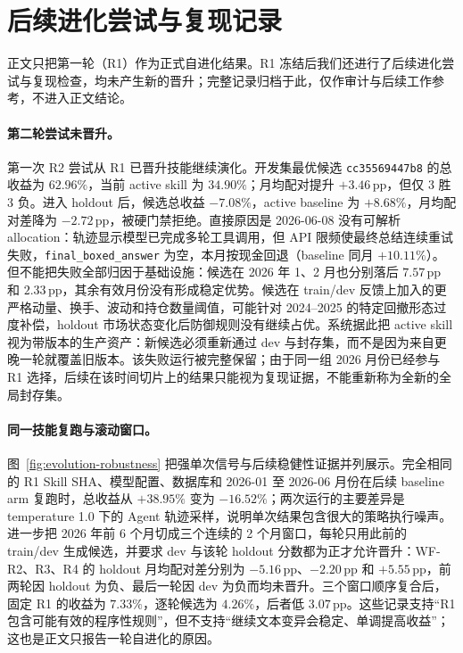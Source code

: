 \documentclass[11pt]{article}
\newcommand{\pp}{\,\mathrm{pp}}
\begin{document}
\section{后续进化尝试与复现记录}
\label{sec:appendix-robustness}

正文只把第一轮（R1）作为正式自进化结果。R1 冻结后我们还进行了后续进化尝试与复现检查，均未产生新的晋升；完整记录归档于此，仅作审计与后续工作参考，不进入正文结论。

\paragraph{第二轮尝试未晋升。}
第一次 R2 尝试从 R1 已晋升技能继续演化。开发集最优候选 \texttt{cc35569447b8} 的总收益为 $62.96\%$，当前 active skill 为 $34.90\%$；月均配对提升 $+3.46\pp$，但仅 3 胜 3 负。进入 holdout 后，候选总收益 $-7.08\%$，active baseline 为 $+8.68\%$，月均配对差降为 $-2.72\pp$，被硬门禁拒绝。直接原因是 2026-06-08 没有可解析 allocation：轨迹显示模型已完成多轮工具调用，但 API 限频使最终总结连续重试失败，\texttt{final\_boxed\_answer} 为空，本月按现金回退（baseline 同月 $+10.11\%$）。但不能把失败全部归因于基础设施：候选在 2026 年 1、2 月也分别落后 $7.57\pp$ 和 $2.33\pp$，其余有效月份没有形成稳定优势。候选在 train/dev 反馈上加入的更严格动量、换手、波动和持仓数量阈值，可能针对 2024--2025 的特定回撤形态过度补偿，holdout 市场状态变化后防御规则没有继续占优。系统据此把 active skill 视为带版本的生产资产：新候选必须重新通过 dev 与封存集，而不是因为来自更晚一轮就覆盖旧版本。该失败运行被完整保留；由于同一组 2026 月份已经参与 R1 选择，后续在该时间切片上的结果只能视为复现证据，不能重新称为全新的全局封存集。

\paragraph{同一技能复跑与滚动窗口。}
图~\ref{fig:evolution-robustness} 把强单次信号与后续稳健性证据并列展示。完全相同的 R1 Skill SHA、模型配置、数据库和 2026-01 至 2026-06 月份在后续 baseline arm 复跑时，总收益从 $+38.95\%$ 变为 $-16.52\%$；两次运行的主要差异是 temperature 1.0 下的 Agent 轨迹采样，说明单次结果包含很大的策略执行噪声。进一步把 2026 年前 6 个月切成三个连续的 2 个月窗口，每轮只用此前的 train/dev 生成候选，并要求 dev 与该轮 holdout 分数都为正才允许晋升：WF-R2、R3、R4 的 holdout 月均配对差分别为 $-5.16\pp$、$-2.20\pp$ 和 $+5.55\pp$，前两轮因 holdout 为负、最后一轮因 dev 为负而均未晋升。三个窗口顺序复合后，固定 R1 的收益为 $7.33\%$，逐轮候选为 $4.26\%$，后者低 $3.07\pp$。这些记录支持``R1 包含可能有效的程序性规则''，但不支持``继续文本变异会稳定、单调提高收益''；这也是正文只报告一轮自进化的原因。
\end{document}
